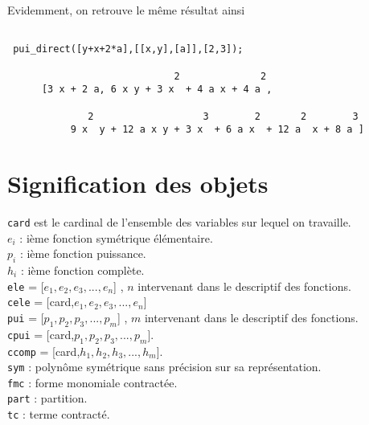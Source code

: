 \normalsize
Evidemment, on retrouve le m\^eme r\'esultat ainsi 
\small
\begin{verbatim}

 pui_direct([y+x+2*a],[[x,y],[a]],[2,3]);

                             2              2
      [3 x + 2 a, 6 x y + 3 x  + 4 a x + 4 a , 

              2                   3        2       2        3
           9 x  y + 12 a x y + 3 x  + 6 a x  + 12 a  x + 8 a ]
\end{verbatim}
\normalsize
\newpage
\section*{Signification des objets }

{\tt card}
 est le cardinal de l'ensemble des variables sur lequel on travaille.\\

{\tt $e_i$} : i\`{e}me fonction sym\'{e}trique \'{e}l\'{e}mentaire.\\

{\tt $p_i$} : i\`{e}me fonction puissance.\\

{\tt $h_i$} : i\`{e}me fonction compl\`ete.\\

{\tt ele} = [$e_{1},e_{2},e_{3},...,e_{n}$] , $n$ intervenant dans le
descriptif des fonctions.\\

{\tt cele} = [card,$e_{1},e_{2},e_{3},...,e_{n}$]\\

{\tt pui} = [$p_{1},p_{2},p_{3},...,p_{m}$] , $m$ intervenant dans le
descriptif des fonctions.\\

{\tt cpui} = [card,$p_{1},p_{2},p_{3},...,p_{m}$].\\

{\tt ccomp} = [card,$h_{1},h_{2},h_{3},...,h_{m}$].\\

{\tt sym} :  polyn\^{o}me sym\'{e}trique sans pr\'{e}cision sur
sa repr\'{e}sentation.\\

{\tt fmc} :  forme monomiale contract\'{e}e.\\

{\tt part} :  partition.\\

{\tt tc} :  terme contract\'{e}.\\

